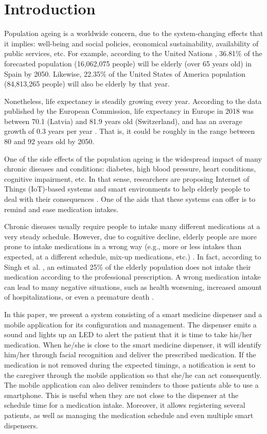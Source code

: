 \documentclass{IOS-Book-Article}
\begin{document}
\section{Introduction}

Population ageing is a worldwide concern, due to the system-changing effects that it implies: well-being and social policies, economical sustainability, availability of public services, etc. For example, according to the United Nations \cite{r1}, 36.81\% of the forecasted population (16,062,075 people) will be elderly (over 65 years old) in Spain by 2050. Likewise, 22.35\% of the United States of America population (84,813,265 people) will also be elderly by that year.

Nonetheless, life expectancy is steadily growing every year. According to the data published by the European Commission, life expectancy in Europe in 2018 was between 70.1 (Latvia) and 81.9 years old (Switzerland), and has an average growth of 0.3 years per year \cite{r2}. That is, it could be roughly in the range between 80 and 92 years old by 2050.

One of the side effects of the population ageing is the widespread impact of many chronic diseases and conditions: diabetes, high blood pressure, heart conditions, cognitive impairment, etc. In that sense, researchers are proposing Internet of Things (IoT)-based systems and smart environments to help elderly people to deal with their consequences \cite{r3,r5}. One of the aids that these systems can offer is to remind and ease medication intakes.

Chronic diseases usually require people to intake many different medications at a very steady schedule. However, due to cognitive decline, elderly people are more prone to intake medications in a wrong way (e.g., more or less intakes than expected, at a different schedule, mix-up medications, etc.) \cite{r6}. In fact, according to Singh et al. \cite{r7}, an estimated 25\% of the elderly population does not intake their medication according to the professional prescription. A wrong medication intake can lead to many negative situations, such as health worsening, increased amount of hospitalizations, or even a premature death \cite{r8,r9,r10}.

In this paper, we present a system consisting of a smart medicine dispenser and a mobile application for its configuration and management. The dispenser emits a sound and lights up an LED to alert the patient that it is time to take his/her medication. When he/she is close to the smart medicine dispenser, it will identify him/her through facial recognition and deliver the prescribed medication. If the medication is not removed during the expected timings, a notification is sent to the caregiver through the mobile application so that she/he can act consequently. The mobile application can also deliver reminders to those patients able to use a smartphone. This is useful when they are not close to the dispenser at the schedule time for a medication intake. Moreover, it allows registering several patients, as well as managing the medication schedule and even multiple smart dispensers.
 
\end{document}
